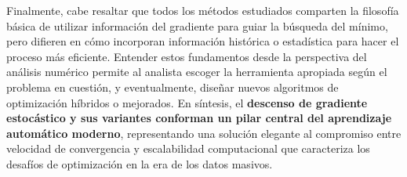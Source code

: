 \documentclass[12pt, spanish]{article}
\begin{document}
Finalmente, cabe resaltar que todos los métodos estudiados comparten la filosofía básica de utilizar información del gradiente para guiar la búsqueda del mínimo, pero difieren en cómo incorporan información histórica o estadística para hacer el proceso más eficiente. Entender estos fundamentos desde la perspectiva del análisis numérico permite al analista escoger la herramienta apropiada según el problema en cuestión, y eventualmente, diseñar nuevos algoritmos de optimización híbridos o mejorados. En síntesis, el \textbf{descenso de gradiente estocástico y sus variantes conforman un pilar central del aprendizaje automático moderno}, representando una solución elegante al compromiso entre velocidad de convergencia y escalabilidad computacional que caracteriza los desafíos de optimización en la era de los datos masivos.
\end{document}
